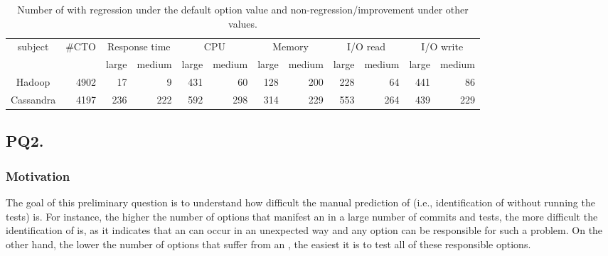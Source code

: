 \begin{table}[t]
\tabcolsep=0.08cm
\caption{Number of \instance with regression under the default option value and  non-regression/improvement under other values.}
    \begin{tabular}{|c|c|c|r|c|r|c|r|c|r|c|r|}
    \hline
    \multirow{2}{*}{subject} & \multirow{2}{*}{\#CTO}    & \multicolumn{2}{c|}{Response time}                     & \multicolumn{2}{c|}{CPU}     & \multicolumn{2}{c|}{Memory}  & \multicolumn{2}{c|}{I/O read}& \multicolumn{2}{c|}{I/O write}   \\ \cline{3-12} 
       & & large                    & \multicolumn{1}{c|}{medium} & large                    & \multicolumn{1}{c|}{medium} & large                    & \multicolumn{1}{c|}{medium} & large                    & \multicolumn{1}{c|}{medium} & large                    & \multicolumn{1}{c|}{medium} \\ \hline
    Hadoop                   & \multicolumn{1}{r|}{4902} & \multicolumn{1}{r|}{17}  & 9 & \multicolumn{1}{r|}{431} & 60& \multicolumn{1}{r|}{128} & 200   & \multicolumn{1}{r|}{228} & 64& \multicolumn{1}{r|}{441} & 86\\ \hline
    Cassandra                & \multicolumn{1}{r|}{4197} & \multicolumn{1}{r|}{236} & 222   & \multicolumn{1}{r|}{592} & 298   & \multicolumn{1}{r|}{314} & 229   & \multicolumn{1}{r|}{553} & 264   & \multicolumn{1}{r|}{439} & 229   \\ \hline
    \end{tabular}
\label{tab:option_regression_default}
\end{table}




\subsection*{\textbf{PQ2. \PQII}}

\subsubsection*{Motivation}

The goal of this preliminary question is to understand how difficult the manual prediction of \inconsistent (i.e., identification of \inconsistent without running the tests) is. For instance, the higher the number of options that manifest an \inconsistent in a large number of commits and tests, the more difficult the identification of \inconsistent is, as it indicates that an \inconsistent can occur in an unexpected way and any option can be responsible for such a problem. On the other hand, the lower the number of options that suffer from an \inconsistent, the easiest it is to test all of these \inconsistent responsible options. 

